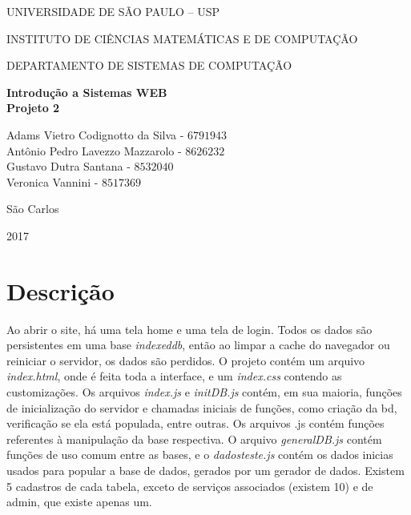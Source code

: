 \documentclass[10pt,a4paper]{article}
\newcommand*\NewPage{\newpage\null\thispagestyle{empty}\newpage}
\begin{document}
\thispagestyle{empty}
\begin{center}
	UNIVERSIDADE DE SÃO PAULO – USP
	
	INSTITUTO DE CIÊNCIAS MATEMÁTICAS E DE COMPUTAÇÃO
	
	DEPARTAMENTO DE SISTEMAS DE COMPUTAÇÃO
	
	\vspace{7cm}
	
	\Large{\textbf{Introdução a Sistemas WEB}}\\
	\small{\textbf{Projeto 2}}
	
	\vspace{6cm}
	
	Adams Vietro Codignotto da Silva - $6791943$ \\ 
	Antônio Pedro Lavezzo Mazzarolo - $8626232$ \\
	Gustavo Dutra Santana - $8532040$\\
	Veronica Vannini - $8517369$\\
	
	\vspace{6cm}
	
	São Carlos
	
	2017
\end{center}

\NewPage
{}

\tableofcontents

\newpage

\section{Descrição}
Ao abrir o site, há uma tela home e uma tela de login. Todos os dados são persistentes em uma base \textit{indexeddb}, então ao limpar a cache do navegador ou reiniciar o servidor, os dados são perdidos. O projeto contém um arquivo \textit{index.html}, onde é feita toda a interface, e um \textit{index.css} contendo as customizações. Os arquivos \textit{index.js} e \textit{initDB.js} contém, em sua maioria, funções de inicialização do servidor e chamadas iniciais de funções, como criação da bd, verificação se ela está populada, entre outras. Os arquivos .js contém funções referentes à manipulação da base respectiva. O arquivo \textit{generalDB.js} contém funções de uso comum entre as bases, e o \textit{dadosteste.js} contém os dados inicias usados para popular a base de dados, gerados por um gerador de dados. Existem 5 cadastros de cada tabela, exceto de serviços associados (existem 10) e de admin, que existe apenas um.
\end{document}
